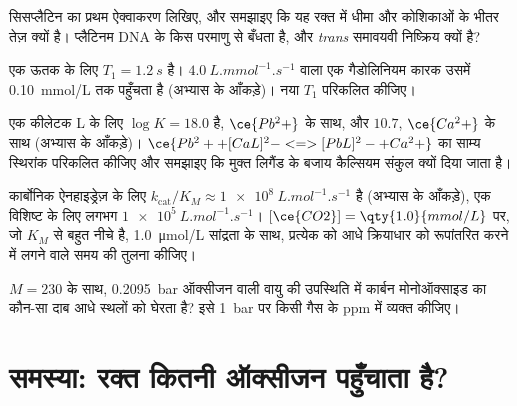 \begin{exercise}[$\star\star$]\label{exo:b3:bioinorganic:8}
सिसप्लैटिन का प्रथम ऐक्वाकरण लिखिए, और समझाइए कि यह रक्त में धीमा और
कोशिकाओं के भीतर तेज़ क्यों है। प्लैटिनम DNA के किस परमाणु से बँधता है, और
\textit{trans} समावयवी निष्क्रिय क्यों है?
\end{exercise}

\begin{exercise}[$\star\star$]\label{exo:b3:bioinorganic:9}
एक ऊतक के लिए $T_1 = \qty{1.2}{s}$ है।  $\qty{4.0}{L.mmol^{-1}.s^{-1}}$ वाला एक गैडोलिनियम कारक उसमें \qty{0.10}{mmol/L}
तक पहुँचता है (अभ्यास के आँकड़े)। नया $T_1$ परिकलित कीजिए।
\end{exercise}

\begin{exercise}[$\star\star\star$]\label{exo:b3:bioinorganic:10}
एक कीलेटक L के लिए $\log K = 18.0$ है, $\ce{Pb^2+}$ के साथ, और $10.7$, $\ce{Ca^2+}$ के साथ (अभ्यास के आँकड़े)।
$\ce{Pb^2+ + [CaL]^2- <=> [PbL]^2- + Ca^2+}$ का साम्य स्थिरांक परिकलित कीजिए और समझाइए कि मुक्त लिगैंड के बजाय
कैल्सियम संकुल क्यों दिया जाता है।
\end{exercise}

\begin{exercise}[$\star\star\star$]\label{exo:b3:bioinorganic:11}
कार्बोनिक ऐनहाइड्रेज़ के लिए $k_{\mathrm{cat}}/K_M \approx \qty{1e8}{L.mol^{-1}.s^{-1}}$ है (अभ्यास के आँकड़े), एक विशिष्ट  के लिए लगभग
$\qty{1e5}{L.mol^{-1}.s^{-1}}$। $[\ce{CO2}] = \qty{1.0}{mmol/L}$ पर, जो $K_M$ से बहुत नीचे है, \qty{1.0}{\micro mol/L}  सांद्रता के साथ, प्रत्येक को
आधे क्रियाधार को रूपांतरित करने में लगने वाले समय की तुलना कीजिए।
\end{exercise}

\begin{exercise}[$\star\star\star$]\label{exo:b3:bioinorganic:12}
$M = 230$ के साथ, \qty{0.2095}{bar} ऑक्सीजन वाली वायु की उपस्थिति में कार्बन मोनोऑक्साइड का कौन-सा दाब
आधे स्थलों को घेरता है? इसे \qty{1}{bar} पर किसी गैस के ppm में व्यक्त कीजिए।
\end{exercise}

\section{समस्या: रक्त कितनी ऑक्सीजन पहुँचाता है?}

